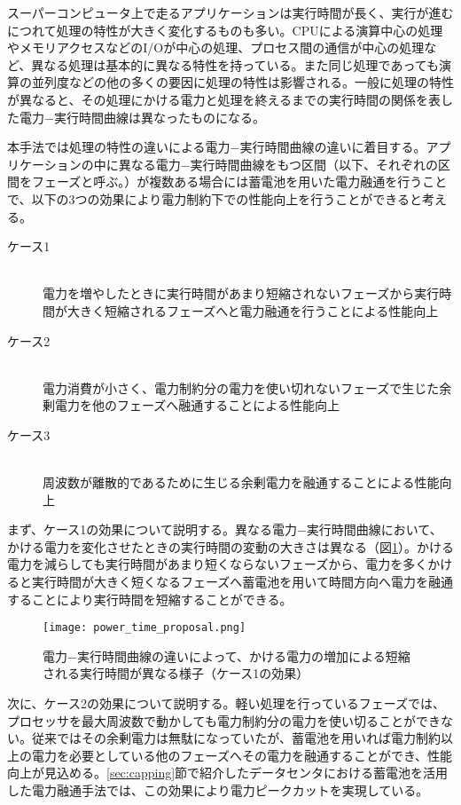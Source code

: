 スーパーコンピュータ上で走るアプリケーションは実行時間が長く、実行が進むにつれて処理の特性が大きく変化するものも多い。CPUによる演算中心の処理やメモリアクセスなどのI/Oが中心の処理、プロセス間の通信が中心の処理など、異なる処理は基本的に異なる特性を持っている。また同じ処理であっても演算の並列度などの他の多くの要因に処理の特性は影響される。一般に処理の特性が異なると、その処理にかける電力と処理を終えるまでの実行時間の関係を表した電力−実行時間曲線は異なったものになる。

本手法では処理の特性の違いによる電力−実行時間曲線の違いに着目する。アプリケーションの中に異なる電力−実行時間曲線をもつ区間（以下、それぞれの区間をフェーズと呼ぶ。）が複数ある場合には蓄電池を用いた電力融通を行うことで、以下の3つの効果により電力制約下での性能向上を行うことができると考える。

\begin{description}
\item[ケース1] \mbox{} \\電力を増やしたときに実行時間があまり短縮されないフェーズから実行時間が大きく短縮されるフェーズへと電力融通を行うことによる性能向上
\item[ケース2] \mbox{} \\電力消費が小さく、電力制約分の電力を使い切れないフェーズで生じた余剰電力を他のフェーズへ融通することによる性能向上
\item[ケース3] \mbox{} \\周波数が離散的であるために生じる余剰電力を融通することによる性能向上
\end{description}


まず、ケース1の効果について説明する。異なる電力−実行時間曲線において、かける電力を変化させたときの実行時間の変動の大きさは異なる（図\ref{fig:power_time_proposal}）。かける電力を減らしても実行時間があまり短くならないフェーズから、電力を多くかけると実行時間が大きく短くなるフェーズへ蓄電池を用いて時間方向へ電力を融通することにより実行時間を短縮することができる。

\begin{figure}[t]
 \begin{center}
  \texttt{[image: power\_time\_proposal.png]}
 \end{center}
 \caption{電力−実行時間曲線の違いによって、かける電力の増加による短縮される実行時間が異なる様子（ケース1の効果）}
 \label{fig:power_time_proposal}
\end{figure}

次に、ケース2の効果について説明する。軽い処理を行っているフェーズでは、プロセッサを最大周波数で動かしても電力制約分の電力を使い切ることができない。従来ではその余剰電力は無駄になっていたが、蓄電池を用いれば電力制約以上の電力を必要としている他のフェーズへその電力を融通することができ、性能向上が見込める。\ref{sec:capping}節で紹介したデータセンタにおける蓄電池を活用した電力融通手法では、この効果により電力ピークカットを実現している。

